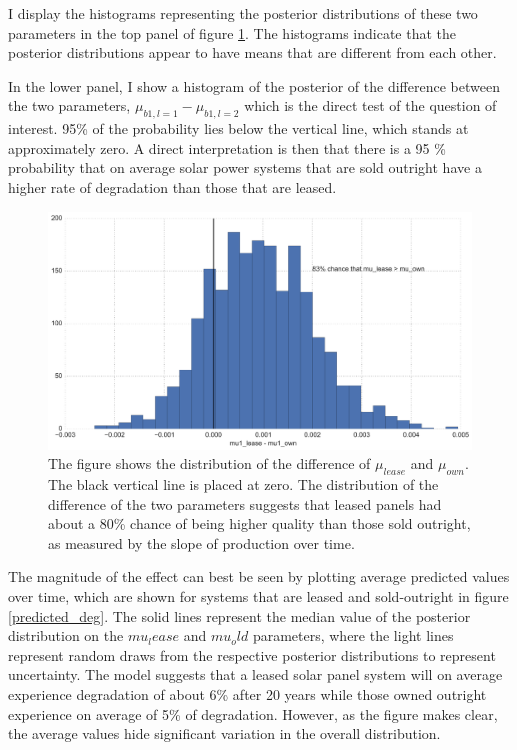 \documentclass[12pt]{article}
\begin{document}
I display the histograms representing the posterior distributions of these two parameters in the top panel of figure \ref{diff_lease}. The histograms indicate that the posterior distributions appear to have means that are different from each other. 

In the lower panel, I show a histogram of the posterior of the difference between the two parameters, $\mu_{b1,l=1} - \mu_{b1,l=2} $ which is the direct test of the question of interest. 95\% of the probability lies below the vertical line, which stands at approximately zero. A direct interpretation is then that there is a 95 \% probability that on average solar power systems that are sold outright have a higher rate of degradation than those that are leased. 

\begin{figure}
	\includegraphics[width=1\textwidth]{figures/diff_lease.png}
	\caption{The figure shows the distribution of the difference of $\mu_{lease}$ and $\mu_{own} $. The black vertical line is placed at zero. The distribution of the difference of the two parameters suggests that leased panels had about a 80\% chance of being higher quality than those sold outright, as measured by the slope of production over time.}
	\label{diff_lease}
\end{figure}

The magnitude of the effect can best be seen by plotting average predicted values over time, which are shown for systems that are leased and sold-outright in figure \ref{predicted_deg}. The solid lines represent the median value of the posterior distribution on the $mu_lease$ and $mu_old$ parameters, where the light lines represent random draws from the respective posterior distributions to represent uncertainty. The model suggests that a leased solar panel system will on average experience degradation of about 6\% after 20 years while those owned outright experience on average of 5\% of degradation. However, as the figure makes clear, the average values hide significant variation in the overall distribution.
\end{document}
